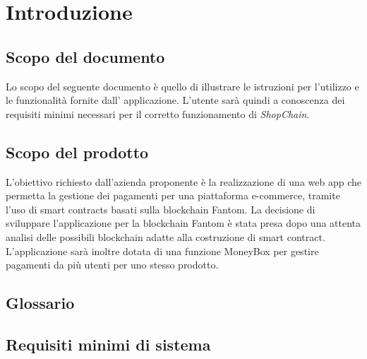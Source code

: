 \section{Introduzione}\label{section:introduzione}

\subsection{Scopo del documento}
Lo scopo del seguente documento è quello di illustrare le istruzioni per l'utilizzo e le funzionalità fornite dall' applicazione.
L'utente sarà quindi a conoscenza dei requisiti minimi necessari per il corretto funzionamento di \textit{ShopChain}.

\subsection{Scopo del prodotto}
L'obiettivo richiesto dall'azienda proponente è la realizzazione di una web app\glo{} che permetta la gestione dei pagamenti per una piattaforma e-commerce\glo{}, tramite l'uso di smart contracts\glo{} basati sulla blockchain\glo{} Fantom\glo{}.
La decisione di sviluppare l'applicazione per la blockchain\glo{} Fantom\glo{} è stata presa dopo una attenta analisi delle possibili blockchain\glo{} adatte alla costruzione di smart contract\glo{}.
L'applicazione sarà inoltre dotata di una funzione MoneyBox\glo{} per gestire pagamenti da più utenti per uno stesso prodotto.

\subsection{Glossario}
\gloDesc{}

\subsection{Requisiti minimi di sistema}
